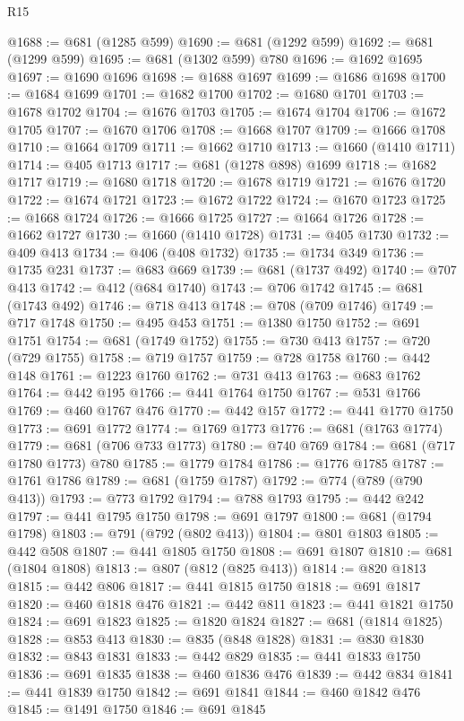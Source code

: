 \begin{lexlean}{R15}
\begin{coremodule}
@1688 := @681 (@1285 @599)
@1690 := @681 (@1292 @599)
@1692 := @681 (@1299 @599)
@1695 := @681 (@1302 @599) @780
@1696 := @1692 @1695
@1697 := @1690 @1696
@1698 := @1688 @1697
@1699 := @1686 @1698
@1700 := @1684 @1699
@1701 := @1682 @1700
@1702 := @1680 @1701
@1703 := @1678 @1702
@1704 := @1676 @1703
@1705 := @1674 @1704
@1706 := @1672 @1705
@1707 := @1670 @1706
@1708 := @1668 @1707
@1709 := @1666 @1708
@1710 := @1664 @1709
@1711 := @1662 @1710
@1713 := @1660 (@1410 @1711)
@1714 := @405 @1713
@1717 := @681 (@1278 @898) @1699
@1718 := @1682 @1717
@1719 := @1680 @1718
@1720 := @1678 @1719
@1721 := @1676 @1720
@1722 := @1674 @1721
@1723 := @1672 @1722
@1724 := @1670 @1723
@1725 := @1668 @1724
@1726 := @1666 @1725
@1727 := @1664 @1726
@1728 := @1662 @1727
@1730 := @1660 (@1410 @1728)
@1731 := @405 @1730
@1732 := @409 @413
@1734 := @406 (@408 @1732)
@1735 := @1734 @349
@1736 := @1735 @231
@1737 := @683 @669
@1739 := @681 (@1737 @492)
@1740 := @707 @413
@1742 := @412 (@684 @1740)
@1743 := @706 @1742
@1745 := @681 (@1743 @492)
@1746 := @718 @413
@1748 := @708 (@709 @1746)
@1749 := @717 @1748
@1750 := @495 @453
@1751 := @1380 @1750
@1752 := @691 @1751
@1754 := @681 (@1749 @1752)
@1755 := @730 @413
@1757 := @720 (@729 @1755)
@1758 := @719 @1757
@1759 := @728 @1758
@1760 := @442 @148
@1761 := @1223 @1760
@1762 := @731 @413
@1763 := @683 @1762
@1764 := @442 @195
@1766 := @441 @1764 @1750
@1767 := @531 @1766
@1769 := @460 @1767 @476
@1770 := @442 @157
@1772 := @441 @1770 @1750
@1773 := @691 @1772
@1774 := @1769 @1773
@1776 := @681 (@1763 @1774)
@1779 := @681 (@706 @733 @1773)
@1780 := @740 @769
@1784 := @681 (@717 @1780 @1773) @780
@1785 := @1779 @1784
@1786 := @1776 @1785
@1787 := @1761 @1786
@1789 := @681 (@1759 @1787)
@1792 := @774 (@789 (@790 @413))
@1793 := @773 @1792
@1794 := @788 @1793
@1795 := @442 @242
@1797 := @441 @1795 @1750
@1798 := @691 @1797
@1800 := @681 (@1794 @1798)
@1803 := @791 (@792 (@802 @413))
@1804 := @801 @1803
@1805 := @442 @508
@1807 := @441 @1805 @1750
@1808 := @691 @1807
@1810 := @681 (@1804 @1808)
@1813 := @807 (@812 (@825 @413))
@1814 := @820 @1813
@1815 := @442 @806
@1817 := @441 @1815 @1750
@1818 := @691 @1817
@1820 := @460 @1818 @476
@1821 := @442 @811
@1823 := @441 @1821 @1750
@1824 := @691 @1823
@1825 := @1820 @1824
@1827 := @681 (@1814 @1825)
@1828 := @853 @413
@1830 := @835 (@848 @1828)
@1831 := @830 @1830
@1832 := @843 @1831
@1833 := @442 @829
@1835 := @441 @1833 @1750
@1836 := @691 @1835
@1838 := @460 @1836 @476
@1839 := @442 @834
@1841 := @441 @1839 @1750
@1842 := @691 @1841
@1844 := @460 @1842 @476
@1845 := @1491 @1750
@1846 := @691 @1845

\end{coremodule}
\end{lexlean}
